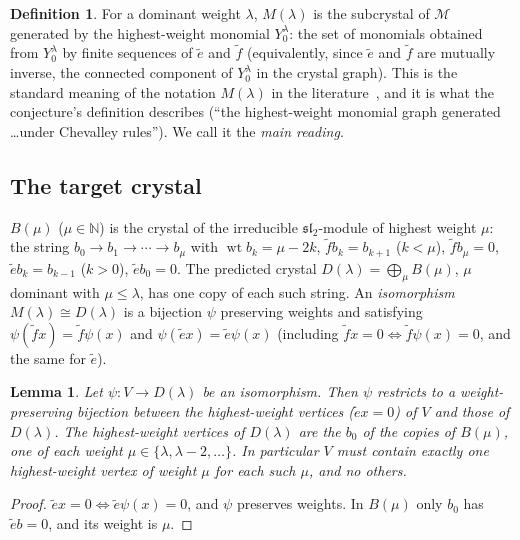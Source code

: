 \documentclass[11pt]{article}
\newtheorem{lemma}[theorem]{Lemma}
\theoremstyle{definition}
\newtheorem{definition}[theorem]{Definition}
\theoremstyle{remark}
\newcommand{\et}{\tilde e}
\newcommand{\ft}{\tilde f}
\newcommand{\wt}{\operatorname{wt}}
\begin{document}
\begin{definition}
For a dominant weight $\lambda$, $M(\lambda)$ is the subcrystal of $\mathcal M$
generated by the highest-weight monomial $Y_0^{\lambda}$: the set of monomials
obtained from $Y_0^\lambda$ by finite sequences of $\et$ and $\ft$ (equivalently,
since $\et$ and $\ft$ are mutually inverse, the connected component of
$Y_0^\lambda$ in the crystal graph). This is the standard meaning of the
notation $M(\lambda)$ in the literature~\cite{kas,kks}, and it is what the
conjecture's definition describes (``the highest-weight monomial graph generated
\dots under Chevalley rules''). We call it the \emph{main reading}.
\end{definition}

\subsection{The target crystal}
$B(\mu)$ ($\mu\in\mathbb N$) is the crystal of the irreducible
$\mathfrak{sl}_2$-module of highest weight $\mu$: the string
$b_0\to b_1\to\cdots\to b_\mu$ with $\wt b_k=\mu-2k$, $\ft b_k=b_{k+1}$ ($k<\mu$),
$\ft b_\mu=0$, $\et b_k=b_{k-1}$ ($k>0$), $\et b_0=0$. The predicted crystal
$D(\lambda)=\bigoplus_{\mu}B(\mu)$, $\mu$ dominant with $\mu\le\lambda$, has one
copy of each such string. An \emph{isomorphism} $M(\lambda)\cong D(\lambda)$ is a
bijection $\psi$ preserving weights and satisfying $\psi(\ft x)=\ft\psi(x)$ and
$\psi(\et x)=\et\psi(x)$ (including $\ft x=0\iff\ft\psi(x)=0$, and the same for
$\et$).

\begin{lemma}\label{lem:hw}
Let $\psi:V\to D(\lambda)$ be an isomorphism. Then $\psi$ restricts to a
weight-preserving bijection between the highest-weight vertices
($\et x=0$) of $V$ and those of $D(\lambda)$. The highest-weight vertices of
$D(\lambda)$ are the $b_0$ of the copies of $B(\mu)$, one of each weight
$\mu\in\{\lambda,\lambda-2,\dots\}$. In particular $V$ must contain exactly one
highest-weight vertex of weight $\mu$ for each such $\mu$, and no others.
\end{lemma}
\begin{proof}
$\et x=0\iff\et\psi(x)=0$, and $\psi$ preserves weights. In $B(\mu)$ only $b_0$
has $\et b=0$, and its weight is $\mu$.
\end{proof}
\end{document}
